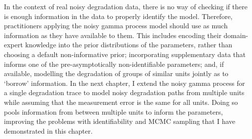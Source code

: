 In the context of real noisy degradation data, there is no way of checking if there is enough information in the data to properly identify the model. Therefore, practitioners applying the noisy gamma process model should use as much information as they have available to them. This includes encoding their domain-expert knowledge into the prior distributions of the parameters, rather than choosing a default non-informative prior; incorporating supplementary data that informs one of the pre-asymptotically non-identifiable parameters; and, if available, modelling the degradation of groups of similar units jointly as to `borrow' information. In the next chapter, I extend the noisy gamma process for a single degradation trace to model noisy degradation paths from multiple units while assuming that the measurement error is the same for all units. Doing so pools information from between multiple units to inform the parameters, improving the problems with identifiability and MCMC sampling that I have demonstrated in this chapter.
